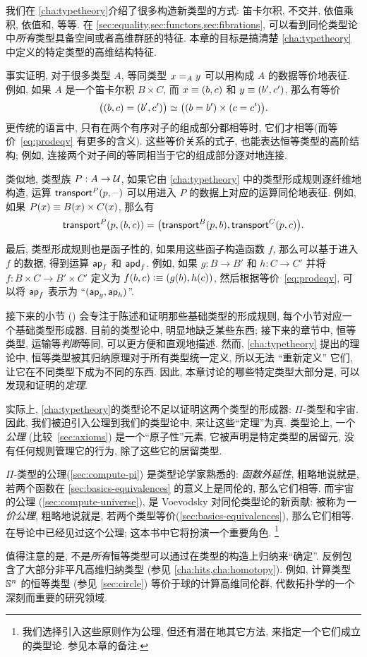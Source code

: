 我们在 \cref{cha:typetheory}介绍了很多构造新类型的方式: 笛卡尔积, 不交并, 依值乘积, 依值和, 等等.
在 \cref{sec:equality,sec:functors,sec:fibrations}, 可以看到同伦类型论中\emph{所有}类型具备空间或者高维群胚的特征.
本章的目标是搞清楚 \cref{cha:typetheory} 中定义的特定类型的高维结构特征.

事实证明, 对于很多类型 $A$, 等同类型 $\id[A]xy$ 可以用构成 $A$ 的数据等价地表征.
例如, 如果 $A$ 是一个笛卡尔积 $B\times C$, 而 $x\jdeq (b,c)$ 和 $y\jdeq(b',c')$, 那么有等价
\begin{equation}\label{eq:prodeqv}
  \eqv{\big((b,c)=(b',c')\big)}{\big((b=b')\times (c=c')\big)}.
\end{equation}
更传统的语言中, 只有在两个有序对子的组成部分都相等时, 它们才相等(而等价~\eqref{eq:prodeqv} 有更多的含义).
这些等价关系的式子, 也能表达恒等类型的高阶结构;
例如, 连接两个对子间的等同相当于它的组成部分逐对地连接.

类似地, 类型族 $P:A\to\type$, 如果它由 \cref{cha:typetheory} 中的类型形成规则逐纤维地构造, 运算 $\transfib{P}{p}{\blank}$ 可以用进入 $P$ 的数据上对应的运算同伦地表征.
例如, 如果 $P(x) \jdeq B(x)\times C(x)$, 那么有
\[\transfib{P}{p}{(b,c)} = \big(\transfib{B}{p}{b},\transfib{C}{p}{c}\big).\]

最后, 类型形成规则也是函子性的, 如果用这些函子构造函数 $f$, 那么可以基于进入 $f$ 的数据, 得到运算 $\apfunc f$ 和 $\apdfunc f$.
例如, 如果 $g:B\to B'$ 和 $h:C\to C'$ 并将 $f:B\times C \to B'\times C'$ 定义为 $f(b,c)\defeq (g(b),h(c))$, 然后根据等价~\eqref{eq:prodeqv}, 可以将 $\apfunc f$ 表示为 ``$(\apfunc g,\apfunc h)$''.

接下来的小节 () 会专注于陈述和证明那些基础类型的形成规则, 每个小节对应一个基础类型形成器.
目前的类型论中, 明显地缺乏某些东西;
接下来的章节中, 恒等类型, 运输等\emph{判断}等同, 可以更方便和直观地描述.
然而, \cref{cha:typetheory} 提出的理论中, 恒等类型被其归纳原理对于所有类型统一定义, 所以无法 ``重新定义'' 它们, 让它在不同类型下成为不同的东西.
因此, 本章讨论的哪些特定类型大部分是, 可以发现和证明的\emph{定理}.

实际上, \cref{cha:typetheory}的类型论不足以证明这两个类型的形成器: $\Pi$-类型和宇宙.
因此, 我们被迫引入公理到我们的类型论中, 来让这些``定理''为真.
类型论上, 一个\emph{公理} (比较~\cref{sec:axioms}) 是一个``原子性''元素, 它被声明是特定类型的居留元, 没有任何规则管理它的行为, 除了这些它的居留类型.
%

%
%
$\Pi$-类型的公理(\cref{sec:compute-pi}) 是类型论学家熟悉的: \emph{函数外延性}, 粗略地说就是, 若两个函数在 \cref{sec:basics-equivalences} 的意义上是同伦的, 那么它们相等.
而宇宙的公理 (\cref{sec:compute-universe}), 是 Voevodsky 对同伦类型论的新贡献: 被称为\emph{一价公理}, 粗略地说就是, 若两个类型等价(\cref{sec:basics-equivalences}), 那么它们相等.
在导论中已经见过这个公理; 这本书中它将扮演一个重要角色.%
\footnote{我们选择引入这些原则作为公理, 但还有潜在地其它方法, 来指定一个它们成立的类型论.
  参见本章的备注.}

值得注意的是, 不是\emph{所有}恒等类型可以通过在类型的构造上归纳来``确定''.
反例包含了大部分非平凡高维归纳类型 (参见 \cref{cha:hits,cha:homotopy}).
例如, 计算类型 $\Sn^n$ 的恒等类型 (参见 \cref{sec:circle}) 等价于球的计算高维同伦群, 代数拓扑学的一个深刻而重要的研究领域.